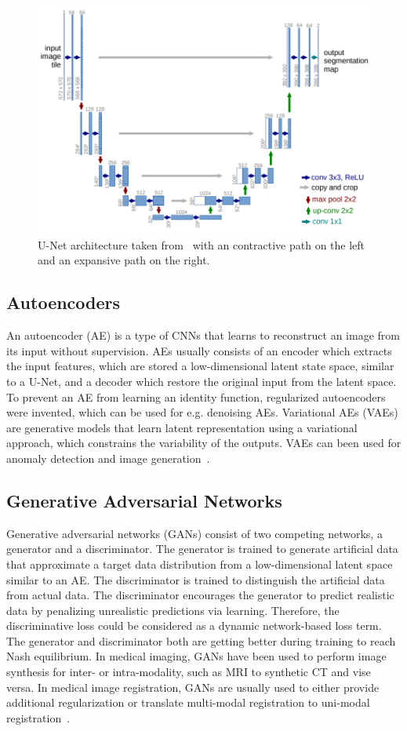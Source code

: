 \documentclass[english,version-2022-01]{uzl-thesis} %
\begin{document}
\begin{figure}[h] %
	\centering
	\graphicspath{{images/}{\main/images/}}
	\includegraphics[width=.75\linewidth]{U-NetArchitecture.png} 
	\caption{U-Net architecture taken from~\cite{U-Net} with an contractive path on the left and an expansive path on the right.}
	\label{fig:U-NetArchitecture}
\end{figure}

\subsection{Autoencoders} \label{SubSec:Autoencoders}
An autoencoder (AE) is a type of CNNs that learns to reconstruct an image from its input without supervision. AEs usually consists of an encoder which extracts the input features, which are stored a low-dimensional latent state space, similar to a U-Net, and a decoder which restore the original input from the latent space. To prevent an AE from learning an identity function, regularized autoencoders were invented, which can be used for e.g. denoising AEs. Variational AEs (VAEs) are generative models that learn latent representation using a variational approach, which constrains the variability of the outputs. VAEs can been used for anomaly detection and image generation~\cite{Fu2020}.

\subsection{Generative Adversarial Networks} \label{SubSec:GANs}
Generative adversarial networks (GANs) consist of two competing networks, a generator and a discriminator. The generator is trained to generate artificial data that approximate a target data distribution from a low-dimensional latent space similar to an AE. The discriminator is trained to distinguish the artificial data from actual data. The discriminator encourages the generator to predict realistic data by penalizing unrealistic predictions via learning. Therefore, the discriminative loss could be considered as a dynamic network-based loss term. The generator and discriminator both are getting better during training to reach Nash equilibrium. In medical imaging, GANs have been used to perform image synthesis for inter- or intra-modality, such as MRI to synthetic CT and vise versa. In medical image registration, GANs are usually used to either provide additional regularization or translate multi-modal registration to uni-modal registration~\cite{Fu2020}.
\end{document}

